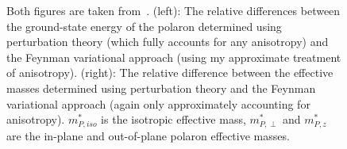 \begin{figure}[t]
\caption{Both figures are taken from~\cite{guster_frohlich_2021}. (left): The relative differences between the ground-state energy of the polaron determined using perturbation theory (which fully accounts for any anisotropy) and the Feynman variational approach (using my approximate treatment of anisotropy). (right): The relative difference between the effective masses determined using perturbation theory and the Feynman variational approach (again only approximately accounting for anisotropy). $m^*_{P, iso}$ is the isotropic effective mass, $m^*_{P, \perp}$ and $m^*_{P, z}$ are the in-plane and out-of-plane polaron effective masses.}
\label{fig:anisotropy}
\end{figure}

